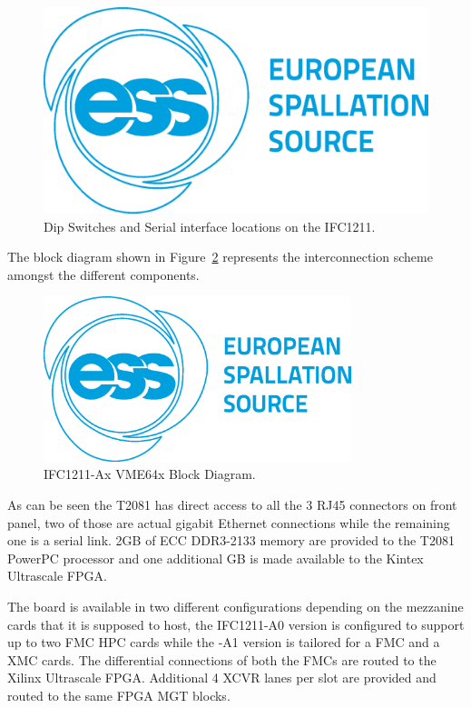 \documentclass[11pt
  , a4paper
  , article
  , oneside
  , showtrims
]{memoir}
\begin{document}
\begin{figure}[!htb]
	\centering
	\hspace*{-2.5cm}
	\includegraphics[width=1.4\textwidth]{./figs/ESS_Logo_Frugal_Blue_cmyk.eps}
	\caption{
		Dip Switches and Serial interface locations on the IFC1211.
	}
	\label{fig:ser_ifc_con}
\end{figure}

The block diagram shown in Figure~\ref{fig:ifc1211_bd} represents the interconnection scheme amongst the different components.

\begin{figure}[!htb]
	\centering
	\includegraphics[width=0.80\textwidth]{./figs/ESS_Logo_Frugal_Blue_cmyk.eps}
	\caption{
		IFC1211-Ax VME64x Block Diagram.
	}
	\label{fig:ifc1211_bd}   
\end{figure}

As can be seen the T2081 has direct access to all the 3 RJ45 connectors on front panel, two of those are actual gigabit Ethernet connections while the remaining one is a serial link.
2GB of ECC DDR3-2133 memory are provided to the T2081 PowerPC processor and one additional GB is made available to the Kintex Ultrascale FPGA.

The board is available in two different configurations depending on the mezzanine cards that it is supposed to host, the IFC1211-A0 version is configured to support up to two FMC HPC cards while the -A1 version is tailored for a FMC and a XMC cards.
The differential connections of both the FMCs are routed to the Xilinx Ultrascale FPGA. Additional 4 XCVR lanes per slot are provided and routed to the same FPGA MGT blocks.
\end{document}
